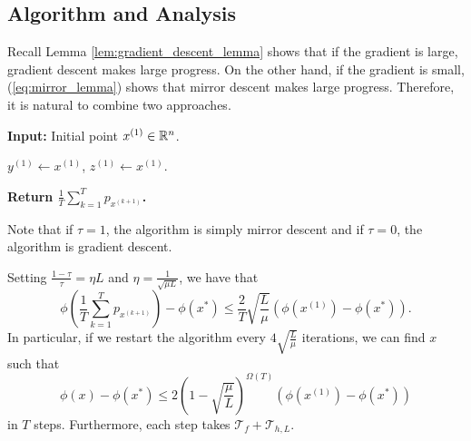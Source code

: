 \subsection{Algorithm and Analysis}

Recall Lemma \ref{lem:gradient_descent_lemma} shows that if the gradient
is large, gradient descent makes large progress. On the other hand,
if the gradient is small, (\ref{eq:mirror_lemma}) shows that mirror
descent makes large progress. Therefore, it is natural to combine
two approaches.

\begin{algorithm2e}[H]

\caption{$\mathtt{AGD}$}

\SetAlgoLined

\textbf{Input:} Initial point $x^{(1)}\in\mathbb{R}^{n}$.

$y^{(1)}\leftarrow x^{(1)}$, $z^{(1)}\leftarrow x^{(1)}$.


\textbf{Return $\frac{1}{T}\sum^{T}_{k=1}p_{x^{(k+1)}}$.}

\end{algorithm2e}

Note that if $\tau=1$, the algorithm is simply mirror descent and
if $\tau=0$, the algorithm is gradient descent.
\begin{thm}
\label{thm:AGD}Setting $\frac{1-\tau}{\tau}=\eta L$ and $\eta=\frac{1}{\sqrt{\mu L}}$,
we have that
\[
\phi(\frac{1}{T}\sum^{T}_{k=1}p_{x^{(k+1)}})-\phi(x^{*})\leq\frac{2}{T}\sqrt{\frac{L}{\mu}}\left(\phi(x^{(1)})-\phi(x^{*})\right).
\]
In particular, if we restart the algorithm every $4\sqrt{\frac{L}{\mu}}$
iterations, we can find $x$ such that 
\[
\phi(x)-\phi(x^{*})\leq2(1-\sqrt{\frac{\mu}{L}})^{\Omega(T)}\left(\phi(x^{(1)})-\phi(x^{*})\right)
\]
in $T$ steps. Furthermore, each step takes $\mathcal{T}_{f}+\mathcal{T}_{h,L}$.
\end{thm}

